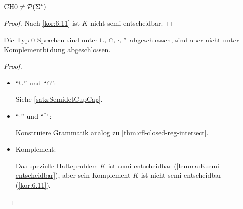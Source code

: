 \begin{Satz}
 $\text{CH{0}}\neq \mathcal{P}(\Sigma^*)$
\end{Satz}
\begin{proof}
 Nach \autoref{kor:6.11} ist $\overline{K}$ nicht semi-entscheidbar.
\end{proof}



\begin{Satz}[name={[Abgeschlossenheit von Typ-0 Sprachen]}]\label{satz:Typ-0-abgeschl}
	Die Typ-0 Sprachen sind unter $\thinmuskip=6mu\cup,\cap,\cdot,{}^*$ abgeschlossen, sind aber nicht unter Komplementbildung abgeschlossen.
\end{Satz}
\begin{proof}~
    \begin{itemize}
     \item "`$\cup$"' und "`$\cap$"':
     
     Siehe \autoref{satz:SemidetCupCap}.

     \item  "`$\cdot$"' und "`$^*$"':
     
     Konstruiere Grammatik analog zu \autoref{thm:cfl-closed-reg-intersect}.
     
     \item Komplement:
     
     Das spezielle Halteproblem $K$ ist semi-entscheidbar (\autoref{lemma:Ksemi-entscheidbar}),
     aber sein Komplement $\overline{K}$ ist nicht semi-entscheidbar (\autoref{kor:6.11}).
     \qedhere
     \end{itemize}
\end{proof}

% 
% 
